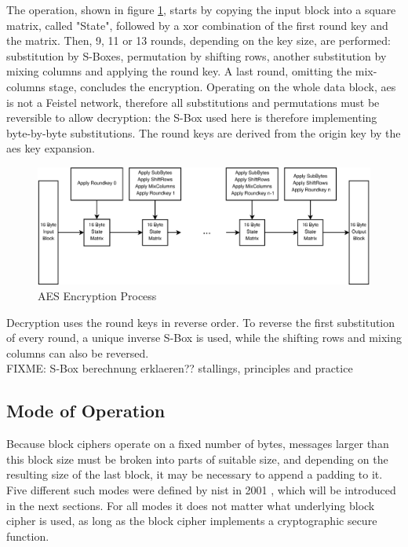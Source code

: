 The operation, shown in figure \ref{fig:aesEnc}, starts by copying the input block into a square matrix, called "State",
followed by a \gls{xor} combination of the first round 
key and the matrix. Then, 9, 11 or 13 rounds, depending on the key size, are performed: substitution by S-Boxes, permutation by shifting rows, 
another substitution by mixing columns and applying the round key. A last round, omitting the mix-columns stage, concludes the encryption.
Operating on the whole data block, \gls{aes} is not a Feistel network, therefore all substitutions and permutations must be reversible to allow decryption: 
the S-Box used here is therefore implementing byte-by-byte substitutions. The round keys are derived from the origin key by the \gls{aes} key expansion.

\begin{figure}
    \centering
    \includegraphics[width=1\textwidth]{figures/aesEnc.eps}
    \caption{AES Encryption Process}
    \label{fig:aesEnc}
\end{figure}

Decryption uses the round keys in reverse order. To reverse the first substitution of every round, a unique inverse S-Box is used, while the shifting rows
and mixing columns can also be reversed.
\\

FIXME: S-Box berechnung erklaeren?? stallings, principles and practice 

\subsection{Mode of Operation}\label{confidentiality}

Because block ciphers  operate on a fixed number of bytes, messages larger than this block size must be broken into parts of suitable size, and depending on 
the resulting size of the last block, it may be necessary to append a padding to it. Five different such modes were defined by \gls{nist} in 2001 \cite{moo},
which will be introduced in the next sections. For all modes it does not matter what underlying block cipher is used, as long as the block cipher implements
a cryptographic secure function. 

